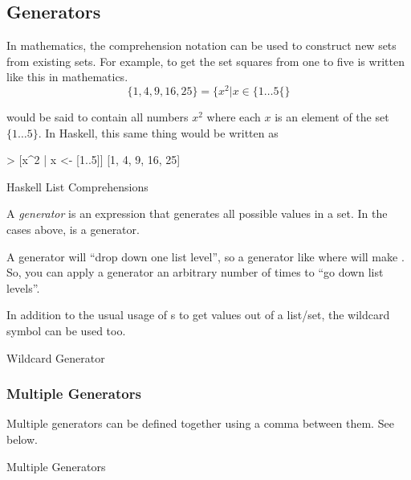 \subsection{Generators}\label{subsec:Generators}
In mathematics, the comprehension notation can be used to construct new sets from existing sets.
For example, to get the set squares from one to five is written like this in mathematics.
\begin{equation}\label{eq:Generator}
  \lbrace 1, 4, 9, 16, 25 \rbrace = \bigl\lbrace x^{2} \vert x \in \lbrace 1 \ldots 5 \lbrace \bigr\rbrace
\end{equation}

 would be said to contain all numbers $x^{2}$ where each $x$ is an element of the set $\lbrace 1 \ldots 5 \rbrace$.
In Haskell, this same thing would be written as
\begin{listing}[h!tbp]
\begin{haskellsource}
> [x^2 | x <- [1..5]]
[1, 4, 9, 16, 25]
\end{haskellsource}
\caption{Haskell List Comprehensions}
\label{lst:List_Comprehension}
\end{listing}

\begin{definition}[Generator]\label{def:Generator}
  A \emph{generator} is an expression that generates all possible values in a set.
  In the cases above,  is a generator.

  A generator will ``drop down one list level'', so a generator like  where  will make .
  So, you can apply a generator an arbitrary number of times to ``go down list levels''.
\end{definition}

In addition to the usual usage of s to get values out of a list/set, the wildcard symbol \haskellinline{_} can be used too.
\begin{listing}[h!tbp]
\caption{Wildcard Generator}
\label{lst:Wildcard_Generator}
\end{listing}

\subsubsection{Multiple Generators}\label{subsubsec:Multiple_Generators}
Multiple generators can be defined together using a comma between them.
See  below.
\begin{listing}[h!tbp]
\caption{Multiple Generators}
\label{lst:Multiple_Generators}
\end{listing}

